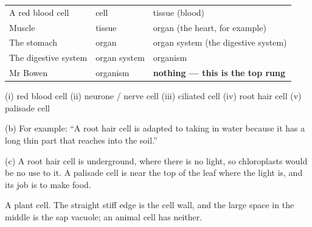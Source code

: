 \documentclass[12pt,a4paper]{article}
\begin{document}
\noindent
\begin{tabularx}{\linewidth}{@{}p{4.4cm}p{3.6cm}X@{}}
  A red blood cell     & cell         & tissue (blood) \\
  Muscle               & tissue       & organ (the heart, for example) \\
  The stomach          & organ        & organ system (the digestive system) \\
  The digestive system & organ system & organism \\
  Mr Bowen             & organism     & \textbf{nothing --- this is the top rung} \\
\end{tabularx}

\smallskip
{}

\noindent (i) red blood cell \quad (ii) neurone / nerve cell \quad (iii) ciliated
cell \quad (iv) root hair cell \quad (v) palisade cell

\smallskip
\noindent (b) For example: ``A root hair cell is adapted to taking in water because it
has a long thin part that reaches into the soil.''

\smallskip
\noindent (c) A root hair cell is underground, where there is no light, so
chloroplasts would be no use to it. A palisade cell is near the top of the leaf where
the light is, and its job is to make food.

\smallskip
{}

\noindent A plant cell. The straight stiff edge is the cell wall, and the large space
in the middle is the sap vacuole; an animal cell has neither.
\end{document}
